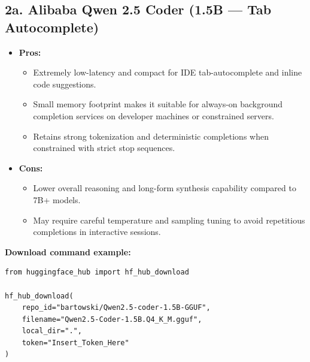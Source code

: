 \documentclass{article}
\begin{document}
\subsection*{2a. Alibaba Qwen 2.5 Coder (1.5B — Tab Autocomplete)}
\begin{itemize}
    \item \textbf{Pros:}
    \begin{itemize}
        \item Extremely low-latency and compact for IDE tab-autocomplete and inline code suggestions.
        \item Small memory footprint makes it suitable for always-on background completion services on developer machines or constrained servers.
        \item Retains strong tokenization and deterministic completions when constrained with strict stop sequences.
    \end{itemize}
    \item \textbf{Cons:}
    \begin{itemize}
        \item Lower overall reasoning and long-form synthesis capability compared to 7B+ models.
        \item May require careful temperature and sampling tuning to avoid repetitious completions in interactive sessions.
    \end{itemize}
\end{itemize}

\noindent\textbf{Download command example:}
\begin{verbatim}
from huggingface_hub import hf_hub_download

hf_hub_download(
    repo_id="bartowski/Qwen2.5-coder-1.5B-GGUF",
    filename="Qwen2.5-Coder-1.5B.Q4_K_M.gguf",
    local_dir=".",
    token="Insert_Token_Here"
)
\end{verbatim}
\end{document}
